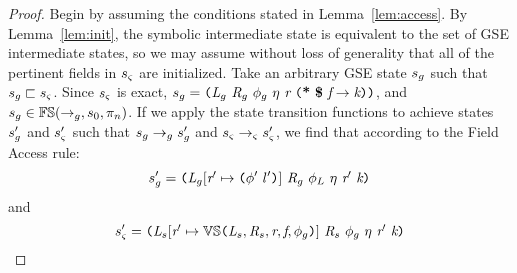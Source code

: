 \begin{proof}
Begin by assuming the conditions stated in Lemma~\ref{lem:access}. By Lemma~\ref{lem:init}, the symbolic intermediate state is equivalent to the set of GSE intermediate states, so we may assume without loss of generality that all of the pertinent fields in $s_{\varsigma}$ are initialized. Take an arbitrary GSE state $s_{g}$ such that $s_{g} \sqsubset s_{\varsigma}$. Since $s_{\varsigma}$ is exact,  $s_\gse = \lp \cfgnt{L}_{\gse}\ \cfgnt{R}_{\gse}\ \phi_\gse\ \eta\ \cfgnt{r}\ \lp \cfgt{*}\ \cfgt{\$}\ \cfgnt{f} \rightarrow \cfgnt{k} \rp \rp$, and $s_{g} \in \mathbb{FS}(\rightarrow_{g},s_0,\pi_n)$. If we apply the state transition functions to achieve states $s_{g}^\prime$ and $s_{\varsigma}^\prime$ such that $s_{g} \rightarrow_{g} s_{g}^\prime$ and  $s_{\varsigma} \rightarrow_{\varsigma} s_{\varsigma}^\prime$, we find that according to the Field Access rule:
$$s_\gse^\prime = \lp \cfgnt{L}_{\gse} [\cfgnt{r}^\prime \mapsto \lp\phi^\prime\ l^\prime\rp]\ \cfgnt{R}_{\gse}\ \phi_L\ \eta\ \cfgnt{r}^\prime\ \cfgnt{k}\rp $$
 and 
 $$ s_\sym^\prime = \lp \cfgnt{L}_{s}[\cfgnt{r}^\prime \mapsto \mathbb{VS}\lp \cfgnt{L}_{s},\cfgnt{R}_{s},\cfgnt{r},\cfgnt{f},\phi_g\rp ]\ \cfgnt{R}_{s}\ \phi_g\ \eta\ \cfgnt{r}^\prime\ \cfgnt{k}\rp $$


\end{proof}
